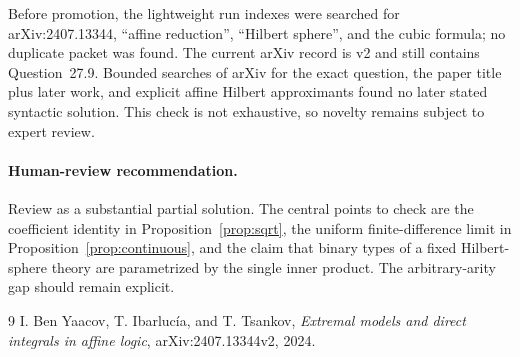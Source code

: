 \documentclass[11pt]{article}
\begin{document}
Before promotion, the lightweight run indexes were searched for
arXiv:2407.13344, ``affine reduction'', ``Hilbert sphere'', and the cubic
formula; no duplicate packet was found.  The current arXiv record is v2 and
still contains Question~27.9.  Bounded searches of arXiv for the exact
question, the paper title plus later work, and explicit affine Hilbert
approximants found no later stated syntactic solution.  This check is not
exhaustive, so novelty remains subject to expert review.

\paragraph{Human-review recommendation.}
Review as a substantial partial solution.  The central points to check are
the coefficient identity in Proposition~\ref{prop:sqrt}, the uniform
finite-difference limit in Proposition~\ref{prop:continuous}, and the claim
that binary types of a fixed Hilbert-sphere theory are parametrized by the
single inner product.  The arbitrary-arity gap should remain explicit.

\begin{thebibliography}{9}
I. Ben Yaacov, T. Ibarluc\'ia, and T. Tsankov,
\emph{Extremal models and direct integrals in affine logic},
arXiv:2407.13344v2, 2024.
\end{thebibliography}
\end{document}
